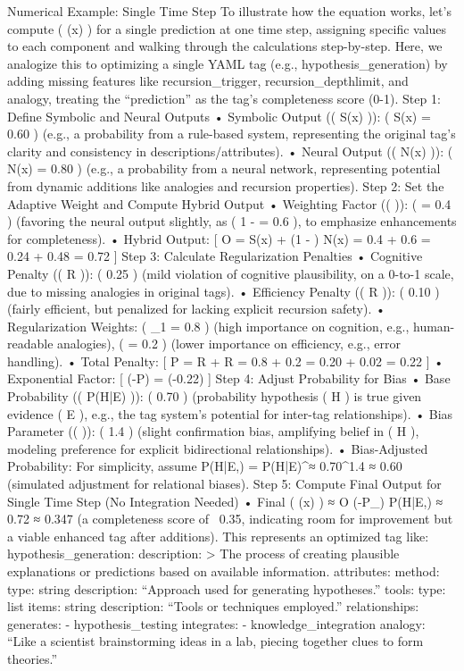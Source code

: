 {Numerical Example: Single Time Step To illustrate how the equation works, let’s compute ( \Psi(x) ) for a single prediction at one time step, assigning specific values to each component and walking through the calculations step-by-step. Here, we analogize this to optimizing a single YAML tag (e.g., hypothesis_generation) by adding missing features like recursion_trigger, recursion_depthlimit, and analogy, treating the “prediction” as the tag’s completeness score (0-1). Step 1: Define Symbolic and Neural Outputs • Symbolic Output (( S(x) )): ( S(x) = 0.60 ) (e.g., a probability from a rule-based system, representing the original tag’s clarity and consistency in descriptions/attributes). • Neural Output (( N(x) )): ( N(x) = 0.80 ) (e.g., a probability from a neural network, representing potential from dynamic additions like analogies and recursion properties). Step 2: Set the Adaptive Weight and Compute Hybrid Output • Weighting Factor (( \alpha )): ( \alpha = 0.4 ) (favoring the neural output slightly, as ( 1 - \alpha = 0.6 ), to emphasize enhancements for completeness). • Hybrid Output: [ O{} = \alpha \cdot S(x) + (1 - \alpha) \cdot N(x) = 0.4  + 0.6  = 0.24 + 0.48 = 0.72 ] Step 3: Calculate Regularization Penalties • Cognitive Penalty (( R{} )): ( 0.25 ) (mild violation of cognitive plausibility, on a 0-to-1 scale, due to missing analogies in original tags). • Efficiency Penalty (( R{} )): ( 0.10 ) (fairly efficient, but penalized for lacking explicit recursion safety). • Regularization Weights: ( \lambda_1 = 0.8 ) (high importance on cognition, e.g., human-readable analogies), (  = 0.2 ) (lower importance on efficiency, e.g., error handling). • Total Penalty: [ P{} =  R{} +  R{} = 0.8  + 0.2  = 0.20 + 0.02 = 0.22 ] • Exponential Factor: [ \exp(-P{}) = \exp(-0.22)  ] Step 4: Adjust Probability for Bias • Base Probability (( P(H|E) )): ( 0.70 ) (probability hypothesis ( H ) is true given evidence ( E ), e.g., the tag system’s potential for inter-tag relationships). • Bias Parameter (( \beta )): ( 1.4 ) (slight confirmation bias, amplifying belief in ( H ), modeling preference for explicit bidirectional relationships). • Bias-Adjusted Probability: For simplicity, assume P(H|E,\beta) = P(H|E)^\beta ≈ 0.70^{1.4} ≈ 0.60 (simulated adjustment for relational biases). Step 5: Compute Final Output for Single Time Step (No Integration Needed) • Final ( \Psi(x) ) ≈ O{} \times \exp(-P_{}) \times P(H|E,\beta) ≈ 0.72   ≈ 0.347 (a completeness score of ~0.35, indicating room for improvement but a viable enhanced tag after additions). This represents an optimized tag like: hypothesis_generation: description: > The process of creating plausible explanations or predictions based on available information. attributes: method: type: string description: “Approach used for generating hypotheses.” tools: type: list items: string description: “Tools or techniques employed.” relationships: generates: - hypothesis_testing integrates: - knowledge_integration analogy: “Like a scientist brainstorming ideas in a lab, piecing together clues to form theories.” }
